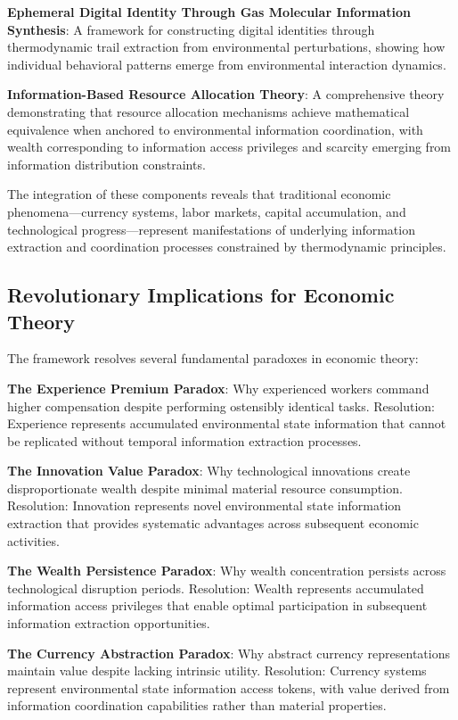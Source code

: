 \documentclass[12pt,a4paper]{article}
\begin{document}
\textbf{Ephemeral Digital Identity Through Gas Molecular Information Synthesis}: A framework for constructing digital identities through thermodynamic trail extraction from environmental perturbations, showing how individual behavioral patterns emerge from environmental interaction dynamics.

\textbf{Information-Based Resource Allocation Theory}: A comprehensive theory demonstrating that resource allocation mechanisms achieve mathematical equivalence when anchored to environmental information coordination, with wealth corresponding to information access privileges and scarcity emerging from information distribution constraints.

The integration of these components reveals that traditional economic phenomena—currency systems, labor markets, capital accumulation, and technological progress—represent manifestations of underlying information extraction and coordination processes constrained by thermodynamic principles.

\subsection{Revolutionary Implications for Economic Theory}

The framework resolves several fundamental paradoxes in economic theory:

\textbf{The Experience Premium Paradox}: Why experienced workers command higher compensation despite performing ostensibly identical tasks. Resolution: Experience represents accumulated environmental state information that cannot be replicated without temporal information extraction processes.

\textbf{The Innovation Value Paradox}: Why technological innovations create disproportionate wealth despite minimal material resource consumption. Resolution: Innovation represents novel environmental state information extraction that provides systematic advantages across subsequent economic activities.

\textbf{The Wealth Persistence Paradox}: Why wealth concentration persists across technological disruption periods. Resolution: Wealth represents accumulated information access privileges that enable optimal participation in subsequent information extraction opportunities.

\textbf{The Currency Abstraction Paradox}: Why abstract currency representations maintain value despite lacking intrinsic utility. Resolution: Currency systems represent environmental state information access tokens, with value derived from information coordination capabilities rather than material properties.
\end{document}
